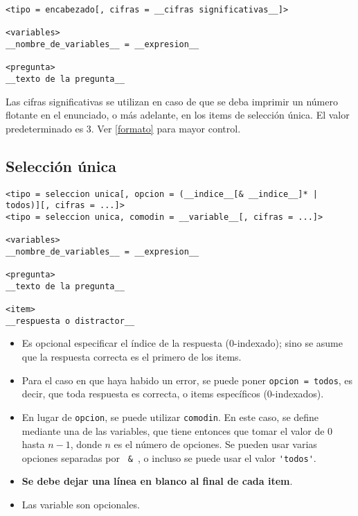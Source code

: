 \documentclass[12pt]{article}
\theoremstyle{definition}
\begin{document}
\small
\begin{verbatim}
<tipo = encabezado[, cifras = __cifras significativas__]>

<variables>
__nombre_de_variables__ = __expresion__

<pregunta>
__texto de la pregunta__
\end{verbatim}
\normalsize

Las cifras significativas se utilizan en caso de que se deba imprimir un número flotante en el enunciado, o más adelante, en los items de selección única. El valor predeterminado es 3. Ver \ref{formato} para mayor control.

\subsection{Selección única}

\small
\begin{verbatim}
<tipo = seleccion unica[, opcion = (__indice__[& __indice__]* | todos)][, cifras = ...]>
<tipo = seleccion unica, comodin = __variable__[, cifras = ...]>

<variables>
__nombre_de_variables__ = __expresion__

<pregunta>
__texto de la pregunta__

<item>
__respuesta o distractor__

\end{verbatim}
\normalsize

\begin{itemize}
  \item Es opcional especificar el índice de la respuesta (0-indexado); sino se asume que la respuesta correcta es el primero de los items.
  \item Para el caso en que haya habido un error, se puede poner \verb|opcion = todos|, es decir, que toda respuesta es correcta, o items específicos (0-indexados).
  \item En lugar de \verb|opcion|, se puede utilizar \verb|comodin|. En este caso, se define mediante una de las variables, que tiene entonces que tomar el valor de 0 hasta $n-1$, donde $n$ es el n\'umero de opciones. Se pueden usar varias opciones separadas por \verb| & |, o incluso se puede usar el valor \verb|'todos'|.
  \item \textbf{Se debe dejar una línea en blanco al final de cada item}.
  \item Las variable son opcionales.
\end{itemize}
\end{document}
